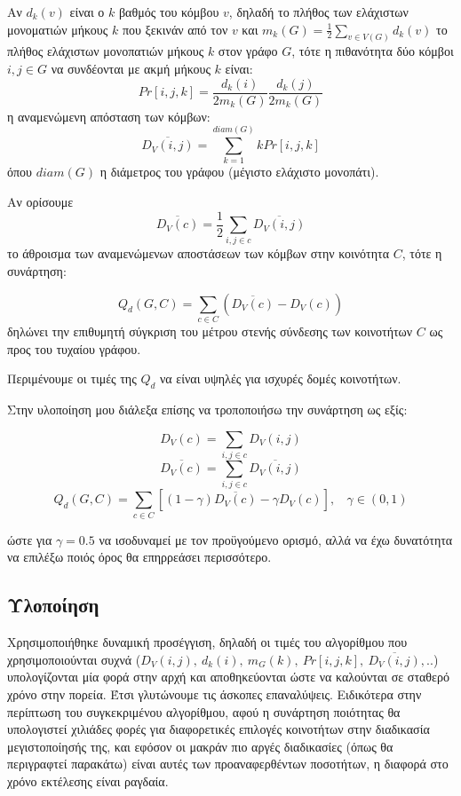 \documentclass[12pt, letterpaper]{article}
\begin{document}
Αν $d_k(v)$ είναι ο $k$ βαθμός του κόμβου $v$, δηλαδή το πλήθος των 
ελάχιστων μονοματιών μήκους $k$ που ξεκινάν από τον $v$ και 
$m_k(G) = \frac{1}{2} \sum_{v \in V (G)} d_k(v)$ το πλήθος 
ελάχιστων μονοπατιών μήκους $k$ στον γράφο $G$, τότε η πιθανότητα δύο κόμβοι
$i,j \in G$ να συνδέονται με ακμή μήκους $k$ είναι:
\[ Pr[i,j,k] = \frac{d_k(i)}{2m_k(G)} \frac{d_k(j)}{2m_k(G)} \]
η αναμενώμενη απόσταση των κόμβων:
\[ \overline{D_V(i,j)} = \sum_{k=1}^{diam(G)} k Pr[i,j,k] \]
όπου $diam(G)$ η διάμετρος του γράφου (μέγιστο ελάχιστο μονοπάτι).

Αν ορίσουμε
\[ \overline{ D_V(c)  } = \frac{1}{2} \sum_{i,j \in c} \overline{ D_V(i,j) }\]
το άθροισμα των αναμενώμενων αποστάσεων των κόμβων στην κοινότητα $C$, 
τότε η συνάρτηση:

\[ Q_d(G,C) = \sum_{c \in C} (\overline{ D_V(c) } - D_V(c))\]
δηλώνει την επιθυμητή σύγκριση του μέτρου στενής σύνδεσης των κοινοτήτων 
$C$ ως προς του τυχαίου γράφου. 

Περιμένουμε οι τιμές της $Q_d$ να είναι υψηλές για ισχυρές δομές κοινοτήτων.


Στην υλοποίηση μου διάλεξα επίσης να τροποποιήσω την συνάρτηση ως εξίς:

\[ D_V(c) = \sum_{i,j \in c} D_V(i,j) \]
\[ \overline{ D_V(c)  } =  \sum_{i,j \in c} \overline{ D_V(i,j) }\]
\[ Q_d(G,C) = \sum_{c \in C} [(1 - \gamma)\overline{ D_V(c) } - \gamma D_V(c) ],  \ \ \ \ \gamma \in (0,1)\]

ώστε για $\gamma = 0.5$ να ισοδυναμεί με τον προϋγούμενο ορισμό, αλλά να έχω 
δυνατότητα να επιλέξω ποιός όρος θα επηρρεάσει περισσότερο.



\subsection{Υλοποίηση}


Χρησιμοποιήθηκε δυναμική προσέγγιση, δηλαδή οι τιμές του αλγορίθμου που χρησιμοποιούνται 
συχνά ($D_V(i,j), \ d_k(i), \ m_G(k), \ Pr[i,j,k],  \ \overline{D_V(i,j)},..$)
υπολογίζονται μία φορά στην αρχή και αποθηκεύονται ώστε να καλούνται σε σταθερό χρόνο στην πορεία. Έτσι γλυτώνουμε τις 
άσκοπες επαναλύψεις. Ειδικότερα στην περίπτωση του συγκεκριμένου αλγορίθμου, αφού 
η συνάρτηση ποιότητας θα υπολογιστεί χιλιάδες φορές για διαφορετικές 
επιλογές κοινοτήτων στην διαδικασία μεγιστοποίησής της, και εφόσον οι μακράν 
πιο αργές διαδικασίες (όπως θα περιγραφτεί παρακάτω) είναι αυτές των 
προαναφερθέντων ποσοτήτων, η διαφορά στο χρόνο εκτέλεσης είναι ραγδαία. 
\end{document}
